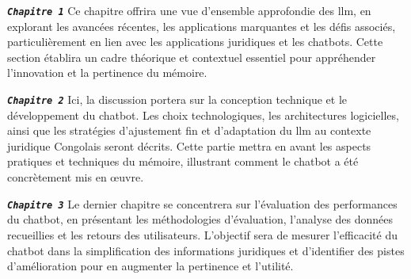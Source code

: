 \begin{list}{}{En dehors de l'introduction, la partie conclusive et l'annexe, ce travail est organisé en trois chapitres comme suit:}
    \item \textbf{\textsl{\texttt{Chapitre 1}}} Ce chapitre offrira une vue d'ensemble approfondie des \ac{llm}, en explorant les avancées récentes, les applications marquantes et les défis associés, particulièrement en lien avec les applications juridiques et les chatbots. Cette section établira un cadre théorique et contextuel essentiel pour appréhender l'innovation et la pertinence du mémoire.
    
    
    \item \textbf{\textsl{\texttt{Chapitre 2}}} Ici, la discussion portera sur la conception technique et le développement du chatbot. Les choix technologiques, les architectures logicielles, ainsi que les stratégies d'ajustement fin et d'adaptation du \ac{llm} au contexte juridique Congolais seront décrits. Cette partie mettra en avant les aspects pratiques et techniques du mémoire, illustrant comment le chatbot a été concrètement mis en œuvre.

    \item \textbf{\textsl{\texttt{Chapitre 3}}} Le dernier chapitre se concentrera sur l'évaluation des performances du chatbot, en présentant les méthodologies d'évaluation, l'analyse des données recueillies et les retours des utilisateurs. L'objectif sera de mesurer l'efficacité du chatbot dans la simplification des informations juridiques et d'identifier des pistes d'amélioration pour en augmenter la pertinence et l'utilité.
\end{list}

